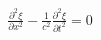 \documentclass[preview]{standalone}
\begin{document}
\begin{align*}
\frac{\partial^2 \xi}{\partial x^2} - \frac{1}{c^2}\frac{\partial^2 \xi}{\partial t^2}  = 0
\end{align*}
\end{document}
